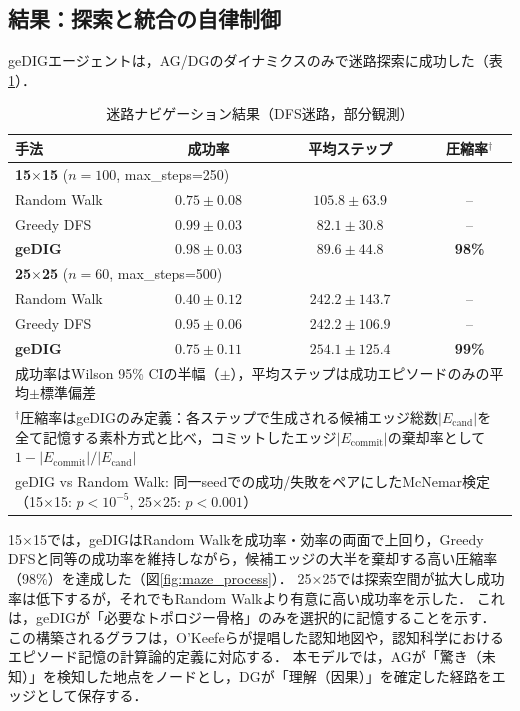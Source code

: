 \subsection{結果：探索と統合の自律制御}
geDIGエージェントは，AG/DGのダイナミクスのみで迷路探索に成功した（表\ref{tab:maze_results}）．

\begin{table}[t]
\centering
\caption{迷路ナビゲーション結果（DFS迷路，部分観測）}
\label{tab:maze_results}
\small
\begin{tabular}{lccc}
\toprule
手法 & 成功率 & 平均ステップ & 圧縮率$^\dagger$ \\
\midrule
\multicolumn{4}{l}{\textbf{15$\times$15} ($n=100$, max\_steps=250)} \\
Random Walk & $0.75 \pm 0.08$ & $105.8 \pm 63.9$ & -- \\
Greedy DFS & $0.99 \pm 0.03$ & $82.1 \pm 30.8$ & -- \\
\textbf{geDIG} & $\mathbf{0.98 \pm 0.03}$ & $\mathbf{89.6 \pm 44.8}$ & \textbf{98\%} \\
\midrule
\multicolumn{4}{l}{\textbf{25$\times$25} ($n=60$, max\_steps=500)} \\
Random Walk & $0.40 \pm 0.12$ & $242.2 \pm 143.7$ & -- \\
Greedy DFS & $0.95 \pm 0.06$ & $242.2 \pm 106.9$ & -- \\
\textbf{geDIG} & $\mathbf{0.75 \pm 0.11}$ & $\mathbf{254.1 \pm 125.4}$ & \textbf{99\%} \\
\bottomrule
\multicolumn{4}{p{0.95\columnwidth}}{\scriptsize 成功率はWilson 95\% CIの半幅（$\pm$），平均ステップは成功エピソードのみの平均$\pm$標準偏差} \\
\multicolumn{4}{p{0.95\columnwidth}}{\scriptsize $^\dagger$圧縮率はgeDIGのみ定義：各ステップで生成される候補エッジ総数$|E_{\mathrm{cand}}|$を全て記憶する素朴方式と比べ，コミットしたエッジ$|E_{\mathrm{commit}}|$の棄却率として $1-|E_{\mathrm{commit}}|/|E_{\mathrm{cand}}|$} \\
\multicolumn{4}{p{0.95\columnwidth}}{\scriptsize geDIG vs Random Walk: 同一seedでの成功/失敗をペアにしたMcNemar検定（15$\times$15: $p < 10^{-5}$, 25$\times$25: $p < 0.001$）} \\
\end{tabular}
\end{table}

15$\times$15では，geDIGはRandom Walkを成功率・効率の両面で上回り，Greedy DFSと同等の成功率を維持しながら，候補エッジの大半を棄却する高い圧縮率（98\%）を達成した（図\ref{fig:maze_process}）．
25$\times$25では探索空間が拡大し成功率は低下するが，それでもRandom Walkより有意に高い成功率を示した．
これは，geDIGが「必要なトポロジー骨格」のみを選択的に記憶することを示す．
この構築されるグラフは，O'Keefeらが提唱した認知地図\cite{okeefe1978}や，認知科学におけるエピソード記憶の計算論的定義に対応する．
本モデルでは，AGが「驚き（未知）」を検知した地点をノードとし，DGが「理解（因果）」を確定した経路をエッジとして保存する．

